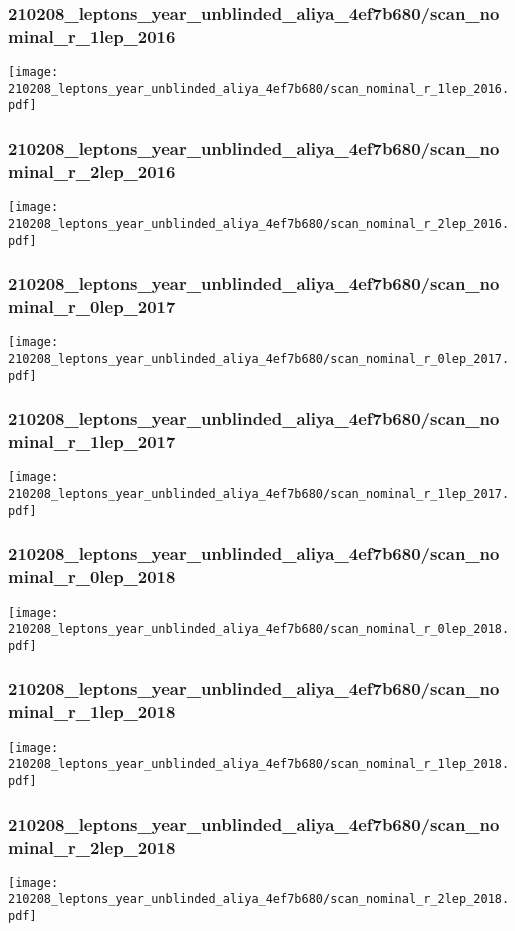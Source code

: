 \begin{frame}
   \frametitle{\small 210208\_leptons\_year\_unblinded\_aliya\_4ef7b680/scan\_nominal\_r\_1lep\_2016}
   \centering
   \texttt{[image: 210208\_leptons\_year\_unblinded\_aliya\_4ef7b680/scan\_nominal\_r\_1lep\_2016.pdf]}
\end{frame}

\begin{frame}
   \frametitle{\small 210208\_leptons\_year\_unblinded\_aliya\_4ef7b680/scan\_nominal\_r\_2lep\_2016}
   \centering
   \texttt{[image: 210208\_leptons\_year\_unblinded\_aliya\_4ef7b680/scan\_nominal\_r\_2lep\_2016.pdf]}
\end{frame}

\begin{frame}
   \frametitle{\small 210208\_leptons\_year\_unblinded\_aliya\_4ef7b680/scan\_nominal\_r\_0lep\_2017}
   \centering
   \texttt{[image: 210208\_leptons\_year\_unblinded\_aliya\_4ef7b680/scan\_nominal\_r\_0lep\_2017.pdf]}
\end{frame}

\begin{frame}
   \frametitle{\small 210208\_leptons\_year\_unblinded\_aliya\_4ef7b680/scan\_nominal\_r\_1lep\_2017}
   \centering
   \texttt{[image: 210208\_leptons\_year\_unblinded\_aliya\_4ef7b680/scan\_nominal\_r\_1lep\_2017.pdf]}
\end{frame}

\begin{frame}
   \frametitle{\small 210208\_leptons\_year\_unblinded\_aliya\_4ef7b680/scan\_nominal\_r\_0lep\_2018}
   \centering
   \texttt{[image: 210208\_leptons\_year\_unblinded\_aliya\_4ef7b680/scan\_nominal\_r\_0lep\_2018.pdf]}
\end{frame}

\begin{frame}
   \frametitle{\small 210208\_leptons\_year\_unblinded\_aliya\_4ef7b680/scan\_nominal\_r\_1lep\_2018}
   \centering
   \texttt{[image: 210208\_leptons\_year\_unblinded\_aliya\_4ef7b680/scan\_nominal\_r\_1lep\_2018.pdf]}
\end{frame}

\begin{frame}
   \frametitle{\small 210208\_leptons\_year\_unblinded\_aliya\_4ef7b680/scan\_nominal\_r\_2lep\_2018}
   \centering
   \texttt{[image: 210208\_leptons\_year\_unblinded\_aliya\_4ef7b680/scan\_nominal\_r\_2lep\_2018.pdf]}
\end{frame}
